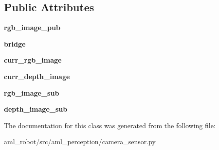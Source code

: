 \subsection*{Public Attributes}
\begin{DoxyCompactItemize}
\item 
\hypertarget{classaml__perception_1_1camera__sensor_1_1_camera_sensor_af2ce3908d0143e32e9bc38d087440873}{}\label{classaml__perception_1_1camera__sensor_1_1_camera_sensor_af2ce3908d0143e32e9bc38d087440873} 
{\bfseries rgb\+\_\+image\+\_\+pub}
\item 
\hypertarget{classaml__perception_1_1camera__sensor_1_1_camera_sensor_afbcaffd62e78201a936cf5d60006bcff}{}\label{classaml__perception_1_1camera__sensor_1_1_camera_sensor_afbcaffd62e78201a936cf5d60006bcff} 
{\bfseries bridge}
\item 
\hypertarget{classaml__perception_1_1camera__sensor_1_1_camera_sensor_a1871c9264c19f303b86da984c4030c80}{}\label{classaml__perception_1_1camera__sensor_1_1_camera_sensor_a1871c9264c19f303b86da984c4030c80} 
{\bfseries curr\+\_\+rgb\+\_\+image}
\item 
\hypertarget{classaml__perception_1_1camera__sensor_1_1_camera_sensor_a24bac5456b53e28f770ce91c2f4699e6}{}\label{classaml__perception_1_1camera__sensor_1_1_camera_sensor_a24bac5456b53e28f770ce91c2f4699e6} 
{\bfseries curr\+\_\+depth\+\_\+image}
\item 
\hypertarget{classaml__perception_1_1camera__sensor_1_1_camera_sensor_abe4b029d9dbaece5072fecd7bf5499d4}{}\label{classaml__perception_1_1camera__sensor_1_1_camera_sensor_abe4b029d9dbaece5072fecd7bf5499d4} 
{\bfseries rgb\+\_\+image\+\_\+sub}
\item 
\hypertarget{classaml__perception_1_1camera__sensor_1_1_camera_sensor_a9efa156e292a81961d991f23434ad86d}{}\label{classaml__perception_1_1camera__sensor_1_1_camera_sensor_a9efa156e292a81961d991f23434ad86d} 
{\bfseries depth\+\_\+image\+\_\+sub}
\end{DoxyCompactItemize}


The documentation for this class was generated from the following file\+:\begin{DoxyCompactItemize}
\item 
aml\+\_\+robot/src/aml\+\_\+perception/camera\+\_\+sensor.\+py\end{DoxyCompactItemize}
